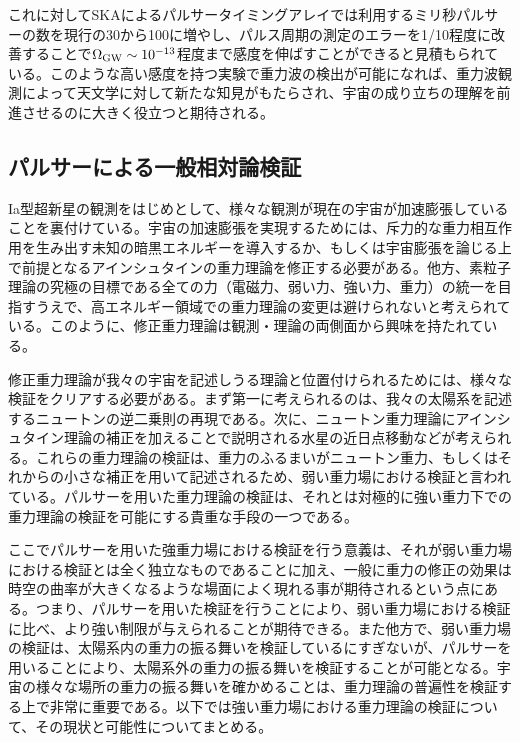 これに対してSKAによるパルサータイミングアレイでは利用するミリ秒パルサーの数を現行の30から100に増やし、パルス周期の測定のエラーを1/10程度に改善することで$\Omega_{\rm GW}\sim 10^{-13}$程度まで感度を伸ばすことができると見積もられている。このような高い感度を持つ実験で重力波の検出が可能になれば、重力波観測によって天文学に対して新たな知見がもたらされ、宇宙の成り立ちの理解を前進させるのに大きく役立つと期待される。



\subsection{パルサーによる一般相対論検証}

Ia型超新星の観測をはじめとして、様々な観測が現在の宇宙が加速膨張していることを裏付けている。宇宙の加速膨張を実現するためには、斥力的な重力相互作用を生み出す未知の暗黒エネルギーを導入するか、もしくは宇宙膨張を論じる上で前提となるアインシュタインの重力理論を修正する必要がある。他方、素粒子理論の究極の目標である全ての力（電磁力、弱い力、強い力、重力）の統一を目指すうえで、高エネルギー領域での重力理論の変更は避けられないと考えられている。このように、修正重力理論は観測・理論の両側面から興味を持たれている。

修正重力理論が我々の宇宙を記述しうる理論と位置付けられるためには、様々な検証をクリアする必要がある。まず第一に考えられるのは、我々の太陽系を記述するニュートンの逆二乗則の再現である。次に、ニュートン重力理論にアインシュタイン理論の補正を加えることで説明される水星の近日点移動などが考えられる。これらの重力理論の検証は、重力のふるまいがニュートン重力、もしくはそれからの小さな補正を用いて記述されるため、弱い重力場における検証と言われている。パルサーを用いた重力理論の検証は、それとは対極的に強い重力下での重力理論の検証を可能にする貴重な手段の一つである。

ここでパルサーを用いた強重力場における検証を行う意義は、それが弱い重力場における検証とは全く独立なものであることに加え、一般に重力の修正の効果は時空の曲率が大きくなるような場面によく現れる事が期待されるという点にある。つまり、パルサーを用いた検証を行うことにより、弱い重力場における検証に比べ、より強い制限が与えられることが期待できる。また他方で、弱い重力場の検証は、太陽系内の重力の振る舞いを検証しているにすぎないが、パルサーを用いることにより、太陽系外の重力の振る舞いを検証することが可能となる。宇宙の様々な場所の重力の振る舞いを確かめることは、重力理論の普遍性を検証する上で非常に重要である。以下では強い重力場における重力理論の検証について、その現状と可能性についてまとめる。


